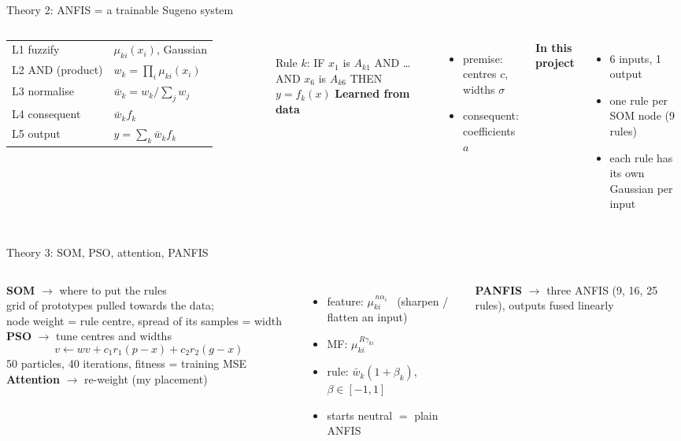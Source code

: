 \documentclass[aspectratio=169,10pt]{beamer}
\begin{document}
\begin{frame}{Theory 2: ANFIS = a trainable Sugeno system}
\begin{columns}[T]
\small
\begin{tabular}{ll}
L1 fuzzify & $\mu_{ki}(x_i)$, Gaussian \\[1mm]
L2 AND (product) & $w_k=\prod_i \mu_{ki}(x_i)$ \\[1mm]
L3 normalise & $\bar w_k = w_k/\sum_j w_j$ \\[1mm]
L4 consequent & $\bar w_k f_k$ \\[1mm]
L5 output & $\hat y=\sum_k \bar w_k f_k$ \\
\end{tabular}\\[4mm]
\normalsize Rule $k$: IF $x_1$ is $A_{k1}$ AND \dots AND $x_6$ is $A_{k6}$ THEN $y=f_k(x)$
\textbf{Learned from data}
\begin{itemize}
\item premise: centres $c$, widths $\sigma$
\item consequent: coefficients $a$
\end{itemize}
\textbf{In this project}
\begin{itemize}
\item 6 inputs, 1 output
\item one rule per SOM node (9 rules)
\item each rule has its own Gaussian per input
\end{itemize}
\end{columns}
\end{frame}

\begin{frame}{Theory 3: SOM, PSO, attention, PANFIS}
\begin{columns}[T]
\textbf{SOM} $\rightarrow$ where to put the rules\\
grid of prototypes pulled towards the data;\\ node weight = rule centre, spread of its samples = width\\[3mm]
\textbf{PSO} $\rightarrow$ tune centres and widths
\[v \leftarrow wv + c_1r_1(p-x)+c_2r_2(g-x)\]
50 particles, 40 iterations, fitness = training MSE
\textbf{Attention} $\rightarrow$ re-weight (my placement)
\begin{itemize}
\item feature: $\mu_{ki}^{\,n\alpha_i}$ \ (sharpen / flatten an input)
\item MF: $\mu_{ki}^{\,R\gamma_{ki}}$
\item rule: $\bar w_k(1+\beta_k)$, $\beta\in[-1,1]$
\item starts neutral $=$ plain ANFIS
\end{itemize}
\textbf{PANFIS} $\rightarrow$ three ANFIS (9, 16, 25 rules), outputs fused linearly
\end{columns}
\end{frame}
\end{document}
